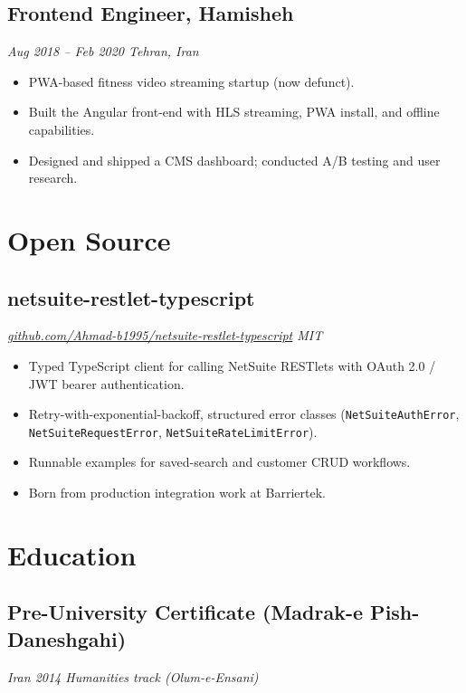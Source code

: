 \documentclass[a4paper,10pt]{article}
\begin{document}
\subsection{Frontend Engineer, Hamisheh}
\emph{Aug 2018 -- Feb 2020 \textbar{} Tehran, Iran}
\begin{itemize}[leftmargin=14pt,itemsep=2pt]
  \item PWA-based fitness video streaming startup (now defunct).
  \item Built the Angular front-end with HLS streaming, PWA install, and offline capabilities.
  \item Designed and shipped a CMS dashboard; conducted A/B testing and user research.
\end{itemize}

\section{Open Source}

\subsection{netsuite-restlet-typescript}
\emph{\href{https://github.com/Ahmad-b1995/netsuite-restlet-typescript}{github.com/Ahmad-b1995/netsuite-restlet-typescript} \textbar{} MIT}
\begin{itemize}[leftmargin=14pt,itemsep=2pt]
  \item Typed TypeScript client for calling NetSuite RESTlets with OAuth 2.0 / JWT bearer authentication.
  \item Retry-with-exponential-backoff, structured error classes (\texttt{NetSuiteAuthError}, \texttt{NetSuiteRequestError}, \texttt{NetSuiteRateLimitError}).
  \item Runnable examples for saved-search and customer CRUD workflows.
  \item Born from production integration work at Barriertek.
\end{itemize}

\section{Education}

\subsection{Pre-University Certificate (Madrak-e Pish-Daneshgahi)}
\emph{Iran \textbar{} 2014 \textbar{} Humanities track (Olum-e-Ensani)}
\end{document}
